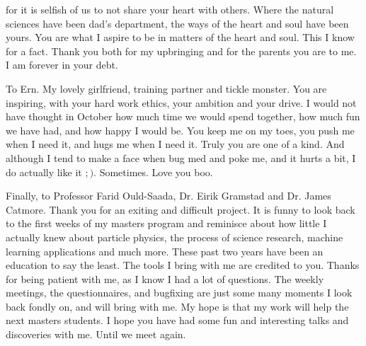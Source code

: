 for it is selfish of us to not share your heart with others. Where the natural sciences have been dad's department, the ways 
of the heart and soul have been yours. You are what I aspire to be in matters of the heart and soul. This I know for a fact. 
Thank you both for my upbringing and for the parents you are to me. I am forever in your debt. \par 
To Ern. My lovely girlfriend, training partner and tickle monster. You are inspiring, with your hard work ethics, your ambition 
and your drive. I would not have thought in October how much time we would spend together, how much fun we have had, and how happy 
I would be. You keep me on my toes, you push me when I need it, and hugs me when I need it. Truly you are one of a kind. 
And although I tend to make a face when bug med and poke me, and it hurts a bit, I do actually like it $;)$. Sometimes. Love you boo.\par
Finally, to Professor Farid Ould-Saada, Dr. Eirik Gramstad and Dr. James Catmore. Thank you for an exiting and difficult project. 
It is funny to look back to the first weeks of my masters program and reminisce about how little I actually knew about particle physics, 
the process of science research, machine learning applications and much more. These past two years have been an education 
to say the least. The tools I bring with me are credited to you. Thanks for being patient with me, as I know I had a lot of questions. 
The weekly meetings, the questionnaires, and bugfixing are just some many moments I look back fondly on, and will bring with me. 
My hope is that my work will help the next masters students. I hope you have had some fun and interesting talks 
and discoveries with me. Until we meet again. 
